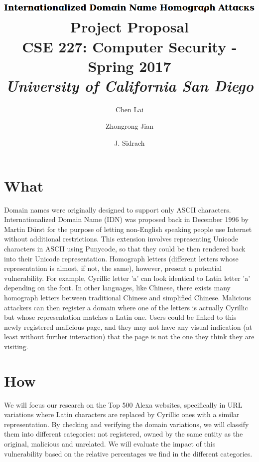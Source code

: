 \documentclass[letterpaper,twocolumn,10pt]{article}
\begin{document}
\date{}

\title{\Large \textbf{
\includegraphics[height=\baselineskip]{title} \\
Project Proposal } \\ \vspace{0.025 in} \large \normalfont
CSE 227: Computer Security - Spring 2017 \\ \textit{
University of California San Diego
}}

\author{
{\rm Chen Lai}\\
\and
{\rm Zhongrong Jian}\\
\and
{\rm J. Sidrach}\\
}

\maketitle

\section{What}

Domain names were originally designed to support only ASCII characters.
Internationalized Domain Name (IDN) was proposed back in December 1996 by Martin Dürst for the purpose of letting non-English speaking people use Internet without  additional restrictions.
This extension involves representing Unicode characters in ASCII using Punycode, so that they could be then rendered back into their Unicode representation.
Homograph letters (different letters whose representation is almost, if not, the same), however, present a potential vulnerability.
For example, Cyrillic letter 'a' can look identical to Latin letter 'a' depending on the font.
In other languages, like Chinese, there exists many homograph letters between traditional Chinese and simplified Chinese.
Malicious attackers can then register a domain where one of the letters is actually Cyrillic but whose representation matches a Latin one.
Users could be linked to this newly registered malicious page, and they may not have any visual indication (at least without further interaction) that the page is not the one they think they are visiting.

\section{How}
We will focus our research on the Top 500 Alexa websites, specifically in URL variations where Latin characters are replaced by Cyrillic ones with a similar representation.
By checking and verifying the domain variations, we will classify them into different categories: not registered, owned by the same entity as the original, malicious and unrelated.
We will evaluate the impact of this vulnerability based on the relative percentages we find in the different categories.
\end{document}
